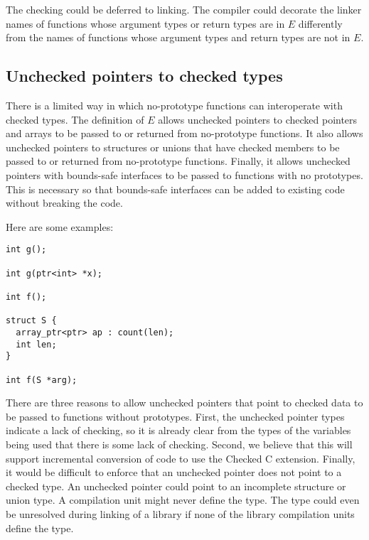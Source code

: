 The checking could be deferred to linking. The compiler could decorate the linker names of
functions whose argument types or return types are in $E$ differently from the names 
of functions whose argument types and return types are not in $E$.

\subsection{Unchecked pointers to checked types}
There is a limited way in which no-prototype functions can interoperate with checked types.
The definition of $E$ allows unchecked
pointers to checked pointers and arrays
to be passed to or returned from no-prototype functions.  It also allows unchecked pointers to
structures or unions that have checked members to be passed to or returned from
no-prototype functions.  Finally, it allows unchecked pointers with bounds-safe interfaces to be
passed to functions with no prototypes.  This is necessary so that bounds-safe interfaces
can be added to existing code without breaking the code.   

Here are some examples:
\begin{verbatim}
int g();

int g(ptr<int> *x);

int f();

struct S {
  array_ptr<ptr> ap : count(len);
  int len;
}

int f(S *arg);
\end{verbatim}

There are three reasons to allow unchecked pointers that point to checked data to
be passed to functions without prototypes.  First, the unchecked pointer types 
indicate a lack of checking, so it is already clear from the types of the variables being
used that there is some lack of checking.  Second, we believe that this
will support incremental conversion of code to use the Checked C extension.  Finally,
it would be difficult to enforce that an unchecked pointer does not point
to a checked type. An unchecked pointer could point to an incomplete
structure or union type. A compilation unit might never define the type. The type
could even be unresolved during linking of a library if none of the library compilation units
define the type.
